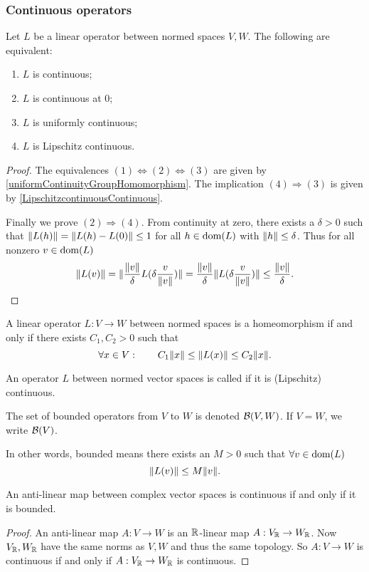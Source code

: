 \subsubsection{Continuous operators}
\begin{theorem} \label{boundedLinearMaps}
Let $L$ be a linear operator between normed spaces $V,W$. The following are equivalent:
\begin{enumerate}
\item $L$ is continuous;
\item $L$ is continuous at $0$;
\item $L$ is uniformly continuous;
\item $L$ is Lipschitz continuous.
\end{enumerate}
\end{theorem}
\begin{proof}
The equivalences $(1) \Leftrightarrow (2) \Leftrightarrow (3)$ are given by \ref{uniformContinuityGroupHomomorphism}. The implication $(4)\Rightarrow (3)$ is given by \ref{LipschitzcontinuousContinuous}.

Finally we prove $(2)\Rightarrow (4)$. From continuity at zero, there exists a $\delta>0$ such that $\lVert L(h)\rVert = \lVert L(h)-L(0)\rVert \leq 1$ for all $h\in \operatorname{dom}(L)$ with $\lVert h\rVert\leq \delta$. Thus for all nonzero $v\in \operatorname{dom}(L)$
\[ \lVert L(v)\rVert = \lVert\frac{\lVert v\rVert}{\delta}L(\delta \frac{v}{\lVert v\rVert})\rVert = \frac{\lVert v\rVert}{\delta}\lVert L(\delta \frac{v}{\lVert v\rVert})\rVert\leq \frac{\lVert v\rVert}{\delta}. \]
\end{proof}
\begin{corollary}
A linear operator $L:V\to W$ between normed spaces is a homeomorphism \textup{if and only if} there exists $C_1,C_2> 0$ such that
\[ \forall x\in V:\qquad C_1\lVert x\rVert\leq \lVert L(x)\rVert \leq C_2\lVert x\rVert. \]
\end{corollary}

\begin{definition}
An operator $L$ between normed vector spaces is called  if it is (Lipschitz) continuous.

The set of bounded operators from $V$ to $W$ is denoted $\operatorname{\mathcal{B}}(V,W)$. If $V=W$, we write $\operatorname{\mathcal{B}}(V)$.
\end{definition}
In other words, bounded means there exists an $M>0$ such that $\forall v\in \operatorname{dom}(L)$
\[ \lVert L(v)\rVert \leq M \lVert v\rVert. \]

\begin{proposition} \label{boundedAntiLinearMaps}
An anti-linear map between complex vector spaces is continuous \textup{if and only if} it is bounded.
\end{proposition}
\begin{proof}
An anti-linear map $A:V\to W$ is an $\mathbb{R}$-linear map $A:V_{\mathbb{R}}\to W_{\mathbb{R}}$. Now $V_{\mathbb{R}}, W_{\mathbb{R}}$ have the same norms as $V,W$ and thus the same topology. So $A:V\to W$ is continuous if and only if $A:V_{\mathbb{R}}\to W_{\mathbb{R}}$ is continuous.
\end{proof}


